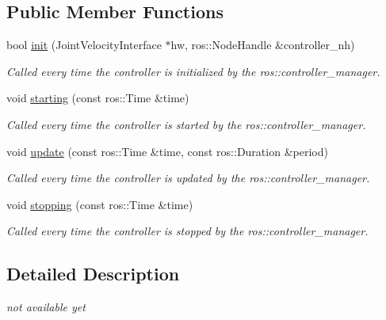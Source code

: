 \subsection*{Public Member Functions}
\begin{DoxyCompactItemize}
\item 
bool \hyperlink{classhiqp_1_1ROSDynamicsController_a2308da73670325884a035055bb86b7d2}{init} (Joint\-Velocity\-Interface $\ast$hw, ros\-::\-Node\-Handle \&controller\-\_\-nh)
\begin{DoxyCompactList}\small\item\em Called every time the controller is initialized by the ros\-::controller\-\_\-manager. \end{DoxyCompactList}\item 
void \hyperlink{classhiqp_1_1ROSDynamicsController_aba55c2ae7df27d53ef5997ce51898ec0}{starting} (const ros\-::\-Time \&time)
\begin{DoxyCompactList}\small\item\em Called every time the controller is started by the ros\-::controller\-\_\-manager. \end{DoxyCompactList}\item 
void \hyperlink{classhiqp_1_1ROSDynamicsController_a369911a027a38555eff59bf838a8a7dd}{update} (const ros\-::\-Time \&time, const ros\-::\-Duration \&period)
\begin{DoxyCompactList}\small\item\em Called every time the controller is updated by the ros\-::controller\-\_\-manager. \end{DoxyCompactList}\item 
void \hyperlink{classhiqp_1_1ROSDynamicsController_aa8305ffc7cfd4eb1727e2133fc37aef9}{stopping} (const ros\-::\-Time \&time)
\begin{DoxyCompactList}\small\item\em Called every time the controller is stopped by the ros\-::controller\-\_\-manager. \end{DoxyCompactList}\end{DoxyCompactItemize}


\subsection{Detailed Description}
{\itshape not available yet} 

